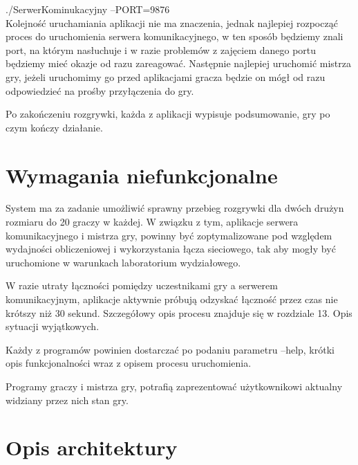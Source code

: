 \documentclass[a4paper]{article}
\begin{document}
./SerwerKominukacyjny --PORT=9876\\

Kolejność uruchamiania aplikacji nie ma znaczenia, jednak najlepiej rozpocząć proces do uruchomienia serwera komunikacyjnego, w ten sposób będziemy znali port, na którym nasłuchuje i w razie problemów z zajęciem danego portu będziemy mieć okazje od razu zareagować. Następnie najlepiej uruchomić mistrza gry, jeżeli uruchomimy go przed aplikacjami gracza będzie on mógł od razu odpowiedzieć na prośby przyłączenia do gry.

Po zakończeniu rozgrywki, każda z aplikacji wypisuje podsumowanie, gry po czym kończy działanie.

\section{Wymagania niefunkcjonalne}
System ma za zadanie umożliwić sprawny przebieg rozgrywki dla dwóch drużyn rozmiaru do 20 graczy w każdej.
W związku z tym, aplikacje serwera komunikacyjnego i mistrza gry, powinny być zoptymalizowane pod względem wydajności obliczeniowej i wykorzystania łącza sieciowego, tak aby mogły być uruchomione w warunkach laboratorium wydziałowego. 

W razie utraty łączności pomiędzy uczestnikami gry a serwerem komunikacyjnym, aplikacje aktywnie próbują odzyskać łączność przez czas nie krótszy niż 30 sekund. Szczegółowy opis procesu znajduje się w rozdziale 13. Opis sytuacji wyjątkowych.

Każdy z programów powinien dostarczać po podaniu parametru --help, krótki opis funkcjonalności wraz z opisem procesu uruchomienia.

Programy graczy i mistrza gry, potrafią zaprezentować użytkownikowi aktualny widziany przez nich stan gry. 
\section{Opis architektury}
\end{document}
